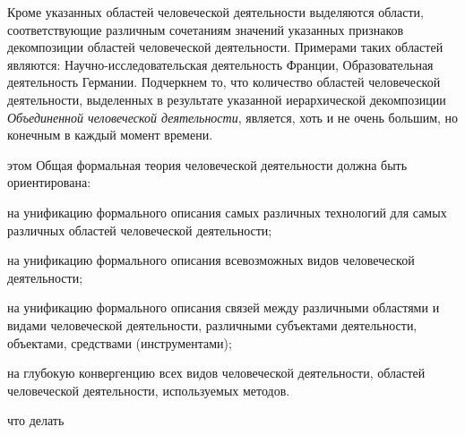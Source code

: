 \begin{scnsubstruct}
{\begin{scnitemize}
            Кроме указанных областей человеческой деятельности выделяются области, соответствующие различным сочетаниям значений указанных признаков декомпозиции областей человеческой деятельности. Примерами таких областей являются: Научно-исследовательская деятельность Франции, Образовательная деятельность Германии. Подчеркнем то, что количество областей человеческой деятельности, выделенных в результате указанной иерархической декомпозиции \textit{Объединенной человеческой деятельности}, является, хоть и не очень большим, но конечным в каждый момент времени.
        \end{scnitemize}
         этом Общая формальная теория человеческой деятельности должна быть ориентирована:
        \begin{scnitemize}
            \item на унификацию формального описания самых различных технологий для самых различных областей человеческой деятельности;
            \item на унификацию формального описания всевозможных видов человеческой деятельности;
            \item на унификацию формального описания связей между различными областями и видами человеческой деятельности, различными субъектами деятельности, объектами, средствами (инструментами);
            \item на глубокую конвергенцию всех видов человеческой деятельности, областей человеческой деятельности, используемых методов.
        \end{scnitemize}
    }
    \begin{scnrelfromvector}{что делать}
\end{scnrelfromvector}
\end{scnsubstruct}
